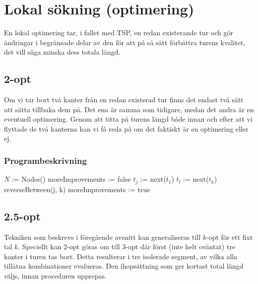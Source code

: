 \documentclass[a4paper,12pt]{article}
\renewcommand{\*}{\ensuremath{\cdot}}
\begin{document}
\section{Lokal sökning (optimering)} 

En lokal optimering tar, i fallet med TSP, en redan existerande tur och gör
ändringar i begränsade delar av den för att på så sätt förbättra turens
kvalitet, det vill säga minska dess totala längd.

\subsection{2-opt} 

Om vi tar bort två kanter från en redan existerad tur finns det endast två sätt
att sätta tillbaka dem på. Det ena är samma som tidigare, medan det andra är en
eventuell optimering. Genom att titta på turens längd både innan och efter att
vi flyttade de två kanterna kan vi få reda på om det faktiskt är en optimering
eller ej.
 
\subsubsection{Programbeskrivning}

\begin{algorithmic}
    \STATE $N$ := Nodes()
        \STATE moreImprovements := false
            \STATE $t_j$ := next($t_1$)
                \STATE $t_l$ := next($t_k$)
                    \STATE reverseBetween(j, k)
                    \STATE moreImprovements := true
                \ENDIF
            \ENDFOR
        \ENDFOR
    \ENDWHILE   
\end{algorithmic}
           

\subsection{2.5-opt} 


Tekniken som beskrevs i föregående avsnitt kan generaliseras till $k$-opt för
ett fixt tal $k$. Speciellt kan 2-opt göras om till 3-opt där först (inte helt
oväntat) tre kanter i turen tas bort. Detta resulterar i tre isolerade segment,
av vilka alla tillåtna kombinationer evalueras. Den ihopsättning som ger kortast
total längd väljs, innan proceduren upprepas.
\end{document}

